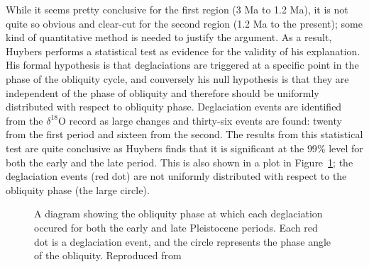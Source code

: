 \documentclass[11pt]{article}
\begin{document}
While it seems pretty conclusive for the first region (3 Ma to 1.2 Ma), it is not quite so obvious and clear-cut for the second region (1.2 Ma to the present); some kind of quantitative method is needed to justify the argument.
As a result, Huybers performs a statistical test as evidence for the validity of his explanation\cite{huybers}.
His formal hypothesis is that deglaciations are triggered at a specific point in the phase of the obliquity cycle, and conversely his null hypothesis is that they are independent of the phase of obliquity and therefore should be uniformly distributed with respect to obliquity phase.
Deglaciation events are identified from the $\delta^{18}$O record as large changes and thirty-six events are found: twenty from the first period and sixteen from the second.
The results from this statistical test are quite conclusive as Huybers finds that it is significant at the $99\%$ level for both the early and the late period.
This is also shown in a plot in Figure~\ref{hypotest}; the deglaciation events (red dot) are not uniformly distributed with respect to the obliquity phase (the large circle).

\begin{figure}
  \centering
  \caption{A diagram showing the obliquity phase at which each deglaciation occured for both the early and late Pleistocene periods. Each red dot is a deglaciation event, and the circle represents the phase angle of the obliquity. Reproduced from \cite{huybers}}
  \label{hypotest}
\end{figure}
\end{document}
